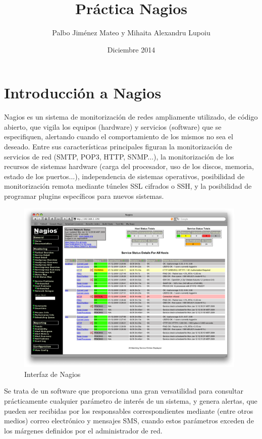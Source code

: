 \documentclass[11pt,a4paper]{article}
\title{Práctica Nagios}
\author{Palbo Jiménez Mateo y Mihaita Alexandru Lupoiu}
\date{Diciembre 2014}
\begin{document}
\maketitle
\tableofcontents
\clearpage

\section{Introducción a Nagios}

    Nagios es un sistema de monitorización de redes ampliamente utilizado, de código abierto, que vigila los equipos (hardware) y servicios (software) que se especifiquen, alertando cuando el comportamiento de los mismos no sea el deseado. Entre sus características principales figuran la monitorización de servicios de red (SMTP, POP3, HTTP, SNMP...), la monitorización de los recursos de sistemas hardware (carga del procesador, uso de los discos, memoria, estado de los puertos...), independencia de sistemas operativos, posibilidad de monitorización remota mediante túneles SSL cifrados o SSH, y la posibilidad de programar plugins específicos para nuevos sistemas\cite{nagios-wikipedia}.
    
\begin{figure}[hbtp]
\centerline{\includegraphics[width=11cm]{images/nagios3-1.png}}
\caption{Interfaz de Nagios}
\label{figura-Nagios}
\end{figure}    

    Se trata de un software que proporciona una gran versatilidad para consultar prácticamente cualquier parámetro de interés de un sistema, y genera alertas, que pueden ser recibidas por los responsables correspondientes mediante (entre otros medios) correo electrónico y mensajes SMS, cuando estos parámetros exceden de los márgenes definidos por el administrador de red.
\end{document}
